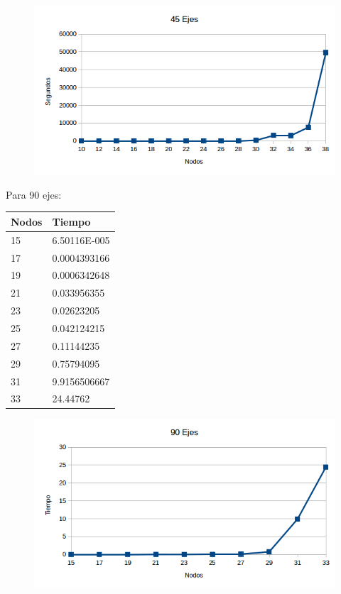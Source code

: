  \begin{figure}[h!]
   \begin{center}
 	\includegraphics[scale=0.7]{imagenes/exacto/45Ejes.png}
   \end{center}
 \end{figure}
 
 Para 90 ejes: \\
 \begin{tabular}{| l | l |}
  \hline
Nodos & Tiempo \\ \hline
15 & 6.50116E-005 \\ \hline
17 & 0.0004393166 \\ \hline
19 & 0.0006342648 \\ \hline
21 & 0.033956355 \\ \hline
23 & 0.02623205 \\ \hline
25 & 0.042124215 \\ \hline
27 & 0.11144235 \\ \hline
29 & 0.75794095 \\ \hline
31 & 9.9156506667 \\ \hline
33 & 24.44762 \\ \hline
 \end{tabular}

 
 
 \begin{figure}[h!]
   \begin{center}
 	\includegraphics[scale=0.7]{imagenes/exacto/90Ejes.png}
   \end{center}
 \end{figure}
 
